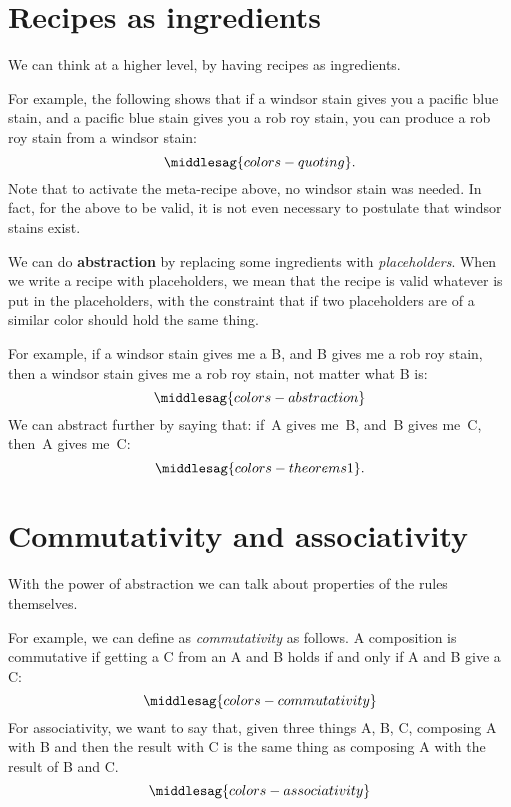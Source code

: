 \section{Recipes as ingredients}


We can think at a higher level, by having recipes as ingredients.

For example, the following shows that if a windsor stain gives you a pacific blue stain, and a pacific blue stain gives you a rob roy stain, you can produce a rob roy stain from a windsor stain:
%
\begin{equation}
    \label{eq:colors-quoting}
    \middlesag{colors-quoting}.
\end{equation}
%
Note that to activate the meta-recipe above, no windsor stain was needed.
In fact, for the above to be valid, it is not even necessary to postulate that windsor stains exist.

We can do \textbf{abstraction} by replacing some ingredients with \emph{placeholders}.
When we write a recipe with placeholders, we mean that the recipe is valid whatever is put in the placeholders, with the constraint that if two placeholders are of a similar color should hold the same thing.

For example, if a windsor stain gives me a B, and B gives me a rob roy stain, then a windsor stain gives me a rob roy stain, not matter what B is:
%
\begin{equation}
    \label{eq:colors-abstraction}
    \middlesag{colors-abstraction}
\end{equation}
%
We can abstract further by saying that: if~A gives me~B, and~B gives me~C, then~A gives me~C:
%
\begin{equation}
    \label{eq:colors-theorems}
    \middlesag{colors-theorems1}.
\end{equation}

\section{Commutativity and associativity}
With the power of abstraction we can talk about properties of the rules themselves.

For example, we can define as \emph{commutativity} as follows.
A composition is commutative if getting a C from an A and B holds if and only if A and B give  a C:
\begin{equation}
    \label{eq:colors-commutativity}
    \middlesag{colors-commutativity}
\end{equation}
%
For associativity, we want to say that, given three things A, B, C, composing A with B and then the result with C is the same thing as composing A with the result of B and C.
\begin{equation}
    \label{eq:colors-associativity}
    \middlesag{colors-associativity}
\end{equation}


